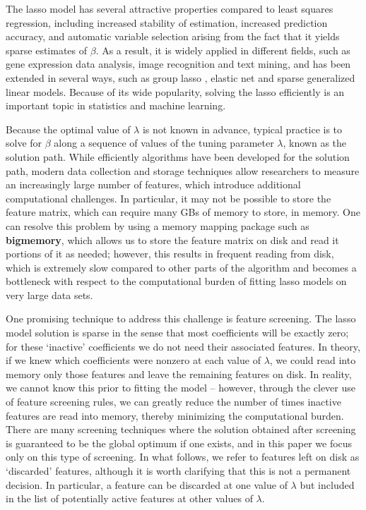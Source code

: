 \documentclass[]{interact}
\theoremstyle{plain}%
\theoremstyle{definition}
\theoremstyle{remark}
\newcommand{\quotes}[1]{`#1'}
\begin{document}
The lasso model has several attractive properties compared to least squares regression, including increased stability of estimation, increased prediction accuracy, and automatic variable selection arising from the fact that it yields sparse estimates of $\beta$.  As a result, it is widely applied in different fields, such as gene expression data analysis, image recognition and text mining, and has been extended in several ways, such as group lasso \citep{yuan2006model}, elastic net \citep{zou2005regularization} and sparse generalized linear models. Because of its wide popularity, solving the lasso efficiently is an important topic in statistics and machine learning.

Because the optimal value of $\lambda$ is not known in advance, typical practice is to solve for $\beta$ along a sequence of values of the tuning parameter $\lambda$, known as the solution path. While efficiently algorithms have been developed \citep{friedman2007pathwise} for the solution path, modern data collection and storage techniques allow researchers to measure an increasingly large number of features, which introduce additional computational challenges. In particular, it may not be possible to store the feature matrix, which can require many GBs of memory to store, in memory. One can resolve this problem by using a memory mapping package such as \textbf{bigmemory}, which allows us to store the feature matrix on disk and read it portions of it as needed; however, this results in frequent reading from disk, which is extremely slow compared to other parts of the algorithm and becomes a bottleneck with respect to the computational burden of fitting lasso models on very large data sets.

One promising technique to address this challenge is feature screening. The lasso model solution is sparse in the sense that most coefficients will be exactly zero; for these \quotes{inactive} coefficients we do not need their associated features.  In theory, if we knew which coefficients were nonzero at each value of $\lambda$, we could read into memory only those features and leave the remaining features on disk. In reality, we cannot know this prior to fitting the model -- however, through the clever use of feature screening rules, we can greatly reduce the number of times inactive features are read into memory, thereby minimizing the computational burden. There are many screening techniques where the solution obtained after screening is guaranteed to be the global optimum if one exists, and in this paper we focus only on this type of screening. In what follows, we refer to features left on disk as \quotes{discarded} features, although it is worth clarifying that this is not a permanent decision.  In particular, a feature can be discarded at one value of $\lambda$ but included in the list of potentially active features at other values of $\lambda$.
\end{document}
